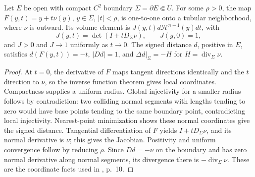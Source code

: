 \begin{lemma}\label{lem:phase-tubular-coordinates}
Let $E$ be open with compact $C^2$ boundary $\Sigma=\partial E\Subset U$. For some $\rho>0$, the map
$F(y,t)=y+t\nu(y)$, $y\in\Sigma$, $|t|<\rho$, is one-to-one onto a tubular neighborhood, where $\nu$ is outward. Its volume element is $J(y,t)d\mathcal H^{n-1}(y)dt$, with
\[
 J(y,t)=\det(I+tD_\Sigma\nu),\qquad J(y,0)=1,
\]
and $J>0$ and $J\to1$ uniformly as $t\to0$. The signed distance $d$, positive in $E$, satisfies $d(F(y,t))=-t$, $|Dd|=1$, and $\Delta d|_\Sigma=-H$ for $H=\operatorname{div}_\Sigma\nu$.
\end{lemma}
\begin{proof}
At $t=0$, the derivative of $F$ maps tangent directions identically and the $t$ direction to $\nu$, so the inverse function theorem gives local coordinates. Compactness supplies a uniform radius. Global injectivity for a smaller radius follows by contradiction: two colliding normal segments with lengths tending to zero would have base points tending to the same boundary point, contradicting local injectivity. Nearest-point minimization shows these normal coordinates give the signed distance. Tangential differentiation of $F$ yields $I+tD_\Sigma\nu$, and its normal derivative is $\nu$; this gives the Jacobian. Positivity and uniform convergence follow by reducing $\rho$. Since $Dd=-\nu$ on the boundary and has zero normal derivative along normal segments, its divergence there is $-\operatorname{div}_\Sigma\nu$. These are the coordinate facts used in \cite{ChAC}, p.~10.
\end{proof}

